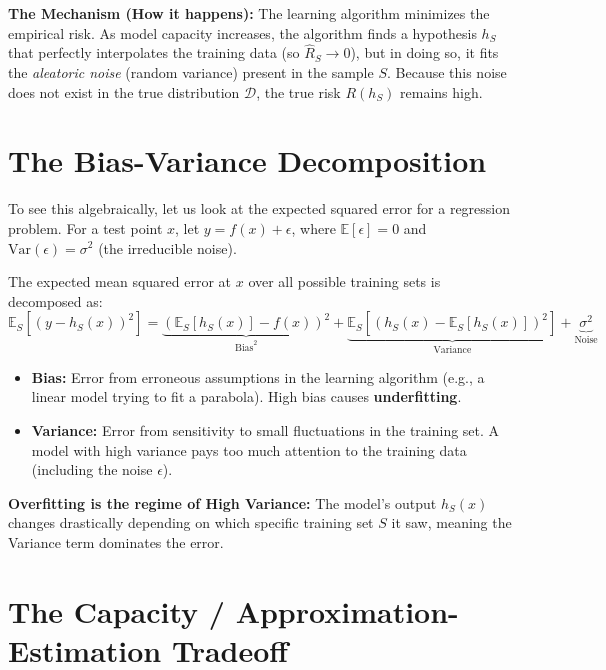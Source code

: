 \documentclass[11pt]{article}
\begin{document}
\textbf{The Mechanism (How it happens):} 
The learning algorithm minimizes the empirical risk. As model capacity increases, the algorithm finds a hypothesis \(h_S\) that perfectly interpolates the training data (so \(\hat{R}_S \to 0\)), but in doing so, it fits the \emph{aleatoric noise} (random variance) present in the sample \(S\). Because this noise does not exist in the true distribution \(\mathcal{D}\), the true risk \(R(h_S)\) remains high.

\hrulefill

\section{The Bias-Variance Decomposition}

To see this algebraically, let us look at the expected squared error for a regression problem. For a test point \(x\), let \(y = f(x) + \epsilon\), where \(\mathbb{E}[\epsilon] = 0\) and \(\text{Var}(\epsilon) = \sigma^2\) (the irreducible noise). 

The expected mean squared error at \(x\) over all possible training sets is decomposed as:
\[
 \mathbb{E}_S \left[ (y - h_S(x))^2 \right] = \underbrace{\left( \mathbb{E}_S[h_S(x)] - f(x) \right)^2}_{\text{Bias}^2} + \underbrace{\mathbb{E}_S \left[ \left( h_S(x) - \mathbb{E}_S[h_S(x)] \right)^2 \right]}_{\text{Variance}} + \underbrace{\sigma^2}_{\text{Noise}} 
\]

\begin{itemize}
    \item \textbf{Bias:} Error from erroneous assumptions in the learning algorithm (e.g., a linear model trying to fit a parabola). High bias causes \textbf{underfitting}.
    \item \textbf{Variance:} Error from sensitivity to small fluctuations in the training set. A model with high variance pays too much attention to the training data (including the noise \(\epsilon\)).
\end{itemize}

\textbf{Overfitting is the regime of High Variance:} The model's output \(h_S(x)\) changes drastically depending on which specific training set \(S\) it saw, meaning the Variance term dominates the error.

\hrulefill

\section{The Capacity / Approximation-Estimation Tradeoff}
\end{document}
